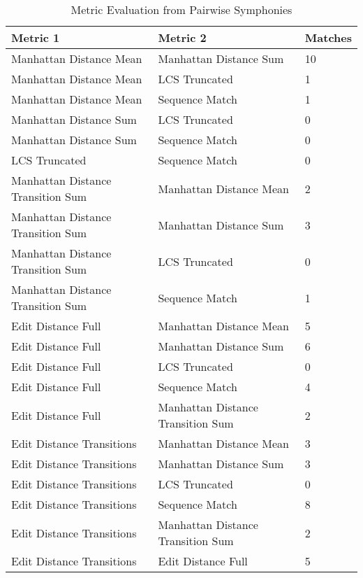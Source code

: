 \begin{longtable}[c]{|l|l|l|}
\caption{Metric Evaluation from Pairwise Symphonies}
\label{my-label}\\
\hline
Metric 1 & Metric 2 & Matches \\ \hline
\endfirsthead
%
\endhead
%
Manhattan Distance Mean & Manhattan Distance Sum & 10 \\ \hline
Manhattan Distance Mean & LCS Truncated & 1 \\ \hline
Manhattan Distance Mean & Sequence Match & 1 \\ \hline
Manhattan Distance Sum & LCS Truncated & 0 \\ \hline
Manhattan Distance Sum & Sequence Match & 0 \\ \hline
LCS Truncated & Sequence Match & 0 \\ \hline
Manhattan Distance Transition Sum & Manhattan Distance Mean & 2 \\ \hline
Manhattan Distance Transition Sum & Manhattan Distance Sum & 3 \\ \hline
Manhattan Distance Transition Sum & LCS Truncated & 0 \\ \hline
Manhattan Distance Transition Sum & Sequence Match & 1 \\ \hline
Edit Distance Full & Manhattan Distance Mean & 5 \\ \hline
Edit Distance Full & Manhattan Distance Sum & 6 \\ \hline
Edit Distance Full & LCS Truncated & 0 \\ \hline
Edit Distance Full & Sequence Match & 4 \\ \hline
Edit Distance Full & Manhattan Distance Transition Sum & 2 \\ \hline
Edit Distance Transitions & Manhattan Distance Mean & 3 \\ \hline
Edit Distance Transitions & Manhattan Distance Sum & 3 \\ \hline
Edit Distance Transitions & LCS Truncated & 0 \\ \hline
Edit Distance Transitions & Sequence Match & 8 \\ \hline
Edit Distance Transitions & Manhattan Distance Transition Sum & 2 \\ \hline
Edit Distance Transitions & Edit Distance Full & 5 \\ \hline
\end{longtable}

